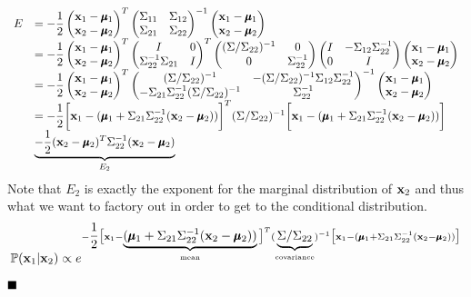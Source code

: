 \documentclass[11pt,a4paper]{article}
\begin{document}
\[\begin{array}{rl}
E&=-\dfrac{1}{2}\begin{pmatrix}
\textbf{x}_1-\pmb{\mu}_1\\\textbf{x}_2-\pmb{\mu}_2
\end{pmatrix}^T\begin{pmatrix}
\Sigma_{11}&\Sigma_{12}\\
\Sigma_{21}&\Sigma_{22}
\end{pmatrix}^{-1}\begin{pmatrix}
\textbf{x}_1-\pmb{\mu}_1\\\textbf{x}_2-\pmb{\mu}_2
\end{pmatrix}\\
&=-\dfrac{1}{2}\begin{pmatrix}
\textbf{x}_1-\pmb{\mu}_1\\
\textbf{x}_2-\pmb{\mu}_2
\end{pmatrix}^T
\begin{pmatrix}
I&0\\
\Sigma_{22}^{-1}\Sigma_{21}&I
\end{pmatrix}^T
\begin{pmatrix}
(\Sigma/\Sigma_{22})^{-1}&0\\
0&\Sigma_{22}^{-1}
\end{pmatrix}
\begin{pmatrix}
I&-\Sigma_{12}\Sigma_{22}^{-1}\\
0&I
\end{pmatrix}
\begin{pmatrix}
\textbf{x}_1-\pmb{\mu}_1\\
\textbf{x}_2-\pmb{\mu}_2
\end{pmatrix}\\
&=-\dfrac{1}{2}\begin{pmatrix}
\textbf{x}_1-\pmb{\mu}_1\\
\textbf{x}_2-\pmb{\mu}_2
\end{pmatrix}^T
\begin{pmatrix}
(\Sigma/\Sigma_{22})^{-1}&-(\Sigma/\Sigma_{22})^{-1}\Sigma_{12}\Sigma_{22}^{-1}\\
-\Sigma_{21}\Sigma_{22}^{-1}(\Sigma/\Sigma_{22})^{-1}&\Sigma_{22}^{-1}
\end{pmatrix}^{-1}
\begin{pmatrix}
\textbf{x}_1-\pmb{\mu}_1\\
\textbf{x}_2-\pmb{\mu}_2
\end{pmatrix}\\
&=-\dfrac{1}{2}\bigg[\textbf{x}_1-(\pmb{\mu}_1+\Sigma_{21}\Sigma_{22}^{-1}(\textbf{x}_2-\pmb{\mu}_2))\bigg]^T(\Sigma/\Sigma_{22})^{-1}\bigg[\textbf{x}_1-(\pmb{\mu}_1+\Sigma_{21}\Sigma_{22}^{-1}(\textbf{x}_2-\pmb{\mu}_2))\bigg]\\
&\underbrace{-\dfrac{1}{2}(\textbf{x}_2-\pmb{\mu}_2)^T\Sigma_{22}^{-1}(\textbf{x}_2-\pmb{\mu}_2)}_{E_2}
\end{array}\]
Note that $E_2$ is exactly the exponent for the marginal distribution of $\textbf{x}_2$ and thus what we want to factory out in order to get to the conditional distribution.
$$\mathbb{P}(\textbf{x}_1|\textbf{x}_2)\propto e^{-\dfrac{1}{2}\big[\textbf{x}_1-\underbrace{(\pmb{\mu}_1+\Sigma_{21}\Sigma_{22}^{-1}(\textbf{x}_2-\pmb{\mu}_2))}_{\text{mean}}\big]^T(\underbrace{\Sigma/\Sigma_{22}}_{\text{covariance}})^{-1}\big[\textbf{x}_1-(\pmb{\mu}_1+\Sigma_{21}\Sigma_{22}^{-1}(\textbf{x}_2-\pmb{\mu}_2))\big]}$$
$\hfill{\blacksquare}$
\end{document}
